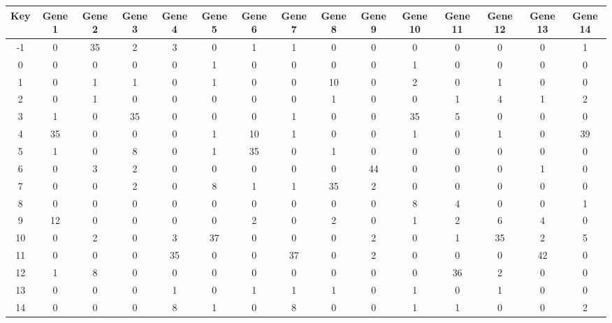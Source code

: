 \begin{tabular}{|c|c|c|c|c|c|c|c|c|c|c|c|c|c|c|}
\hline
Key & Gene 1 & Gene 2 & Gene 3 & Gene 4 & Gene 5 & Gene 6 & Gene 7 & Gene 8 & Gene 9 & Gene 10 & Gene 11 & Gene 12 & Gene 13 & Gene 14 \\
\hline
-1 & 0 & 35 & 2 & 3 & 0 & 1 & 1 & 0 & 0 & 0 & 0 & 0 & 0 & 1 \\
0 & 0 & 0 & 0 & 0 & 1 & 0 & 0 & 0 & 0 & 1 & 0 & 0 & 0 & 0 \\
1 & 0 & 1 & 1 & 0 & 1 & 0 & 0 & 10 & 0 & 2 & 0 & 1 & 0 & 0 \\
2 & 0 & 1 & 0 & 0 & 0 & 0 & 0 & 1 & 0 & 0 & 1 & 4 & 1 & 2 \\
3 & 1 & 0 & 35 & 0 & 0 & 0 & 1 & 0 & 0 & 35 & 5 & 0 & 0 & 0 \\
4 & 35 & 0 & 0 & 0 & 1 & 10 & 1 & 0 & 0 & 1 & 0 & 1 & 0 & 39 \\
5 & 1 & 0 & 8 & 0 & 1 & 35 & 0 & 1 & 0 & 0 & 0 & 0 & 0 & 0 \\
6 & 0 & 3 & 2 & 0 & 0 & 0 & 0 & 0 & 44 & 0 & 0 & 0 & 1 & 0 \\
7 & 0 & 0 & 2 & 0 & 8 & 1 & 1 & 35 & 2 & 0 & 0 & 0 & 0 & 0 \\
8 & 0 & 0 & 0 & 0 & 0 & 0 & 0 & 0 & 0 & 8 & 4 & 0 & 0 & 1 \\
9 & 12 & 0 & 0 & 0 & 0 & 2 & 0 & 2 & 0 & 1 & 2 & 6 & 4 & 0 \\
10 & 0 & 2 & 0 & 3 & 37 & 0 & 0 & 0 & 2 & 0 & 1 & 35 & 2 & 5 \\
11 & 0 & 0 & 0 & 35 & 0 & 0 & 37 & 0 & 2 & 0 & 0 & 0 & 42 & 0 \\
12 & 1 & 8 & 0 & 0 & 0 & 0 & 0 & 0 & 0 & 0 & 36 & 2 & 0 & 0 \\
13 & 0 & 0 & 0 & 1 & 0 & 1 & 1 & 1 & 0 & 1 & 0 & 1 & 0 & 0 \\
14 & 0 & 0 & 0 & 8 & 1 & 0 & 8 & 0 & 0 & 1 & 1 & 0 & 0 & 2 \\
\hline
\end{tabular}